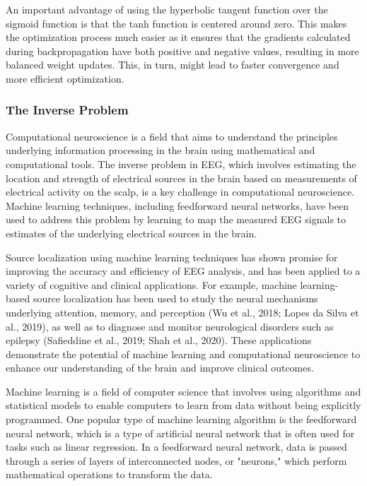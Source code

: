 \documentclass[a4paper, UKenglish, 11pt]{uiomaster}
\begin{document}
An important advantage of using the hyperbolic tangent function over the sigmoid function is that the tanh function is centered around zero. This makes the optimization process much easier as it ensures that the gradients calculated during backpropagation have both positive and negative values, resulting in more balanced weight updates. This, in turn, might lead to faster convergence and more efficient optimization.






\subsubsection{The Inverse Problem}
Computational neuroscience is a field that aims to understand the principles underlying information processing in the brain using mathematical and computational tools. The inverse problem in EEG, which involves estimating the location and strength of electrical sources in the brain based on measurements of electrical activity on the scalp, is a key challenge in computational neuroscience. Machine learning techniques, including feedforward neural networks, have been used to address this problem by learning to map the measured EEG signals to estimates of the underlying electrical sources in the brain.

Source localization using machine learning techniques has shown promise for improving the accuracy and efficiency of EEG analysis, and has been applied to a variety of cognitive and clinical applications. For example, machine learning-based source localization has been used to study the neural mechanisms underlying attention, memory, and perception (Wu et al., 2018; Lopes da Silva et al., 2019), as well as to diagnose and monitor neurological disorders such as epilepsy (Safieddine et al., 2019; Shah et al., 2020). These applications demonstrate the potential of machine learning and computational neuroscience to enhance our understanding of the brain and improve clinical outcomes.

Machine learning is a field of computer science that involves using algorithms and statistical models to enable computers to learn from data without being explicitly programmed. One popular type of machine learning algorithm is the feedforward neural network, which is a type of artificial neural network that is often used for tasks such as linear regression. In a feedforward neural network, data is passed through a series of layers of interconnected nodes, or "neurons," which perform mathematical operations to transform the data.
\end{document}
